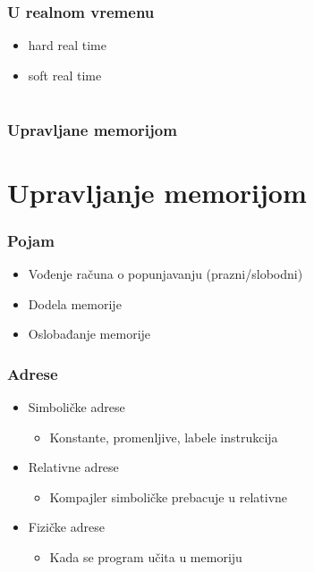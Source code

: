 \documentclass{beamer}
\begin{document}
\begin{frame}
    \frametitle{U realnom vremenu}
    \begin{itemize}
        \item hard real time \newline
        \item soft real time
    \end{itemize}
\end{frame}

\section*{}
\subsection*{}
\begin{frame}
    \frametitle{Upravljane memorijom}
\end{frame}

\section*{Upravljanje memorijom}
\begin{frame}
    \frametitle{Pojam}
    \begin{itemize}
        \item Vođenje računa o popunjavanju (prazni/slobodni) \newline
        \item Dodela memorije \newline
        \item Oslobađanje memorije
    \end{itemize}
\end{frame}

\begin{frame}
    \frametitle{Adrese}
    \begin{itemize}
        \item Simboličke adrese \begin{itemize}
            \item Konstante, promenljive, labele instrukcija \newline
        \end{itemize}
        \item Relativne adrese \begin{itemize}
            \item Kompajler simboličke prebacuje u relativne \newline
        \end{itemize}
        \item Fizičke adrese \begin{itemize}
            \item Kada se program učita u memoriju
        \end{itemize}
    \end{itemize}
\end{frame}
\end{document}
